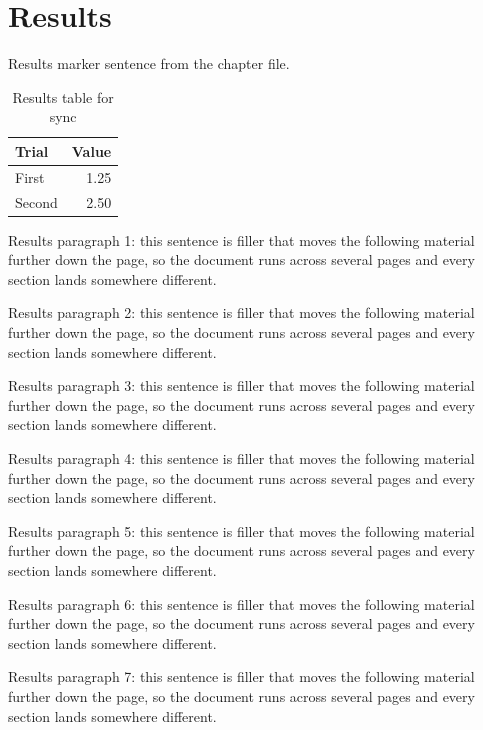 \section{Results}
Results marker sentence from the chapter file.

\begin{table}[ht]
  \centering
  \begin{tabular}{lr}
    \toprule
    Trial & Value \\
    \midrule
    First & 1.25 \\
    Second & 2.50 \\
    \bottomrule
  \end{tabular}
  \caption{Results table for sync}
\end{table}

Results paragraph 1: this sentence is filler that moves the following material further down the page, so the document runs across several pages and every section lands somewhere different.

Results paragraph 2: this sentence is filler that moves the following material further down the page, so the document runs across several pages and every section lands somewhere different.

Results paragraph 3: this sentence is filler that moves the following material further down the page, so the document runs across several pages and every section lands somewhere different.

Results paragraph 4: this sentence is filler that moves the following material further down the page, so the document runs across several pages and every section lands somewhere different.

Results paragraph 5: this sentence is filler that moves the following material further down the page, so the document runs across several pages and every section lands somewhere different.

Results paragraph 6: this sentence is filler that moves the following material further down the page, so the document runs across several pages and every section lands somewhere different.

Results paragraph 7: this sentence is filler that moves the following material further down the page, so the document runs across several pages and every section lands somewhere different.
